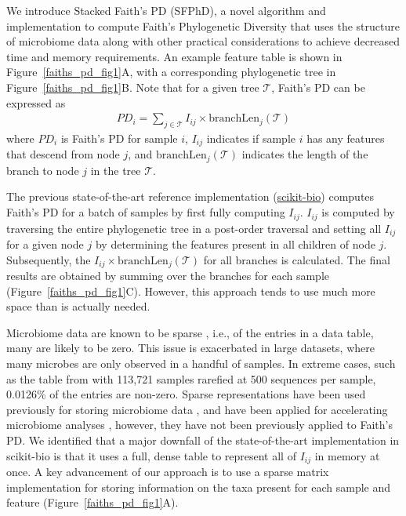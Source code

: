 We introduce Stacked Faith’s PD (SFPhD), a novel algorithm and implementation to compute Faith’s Phylogenetic Diversity that uses the structure of microbiome data along with other practical considerations to achieve decreased time and memory requirements. An example feature table is shown in Figure~\ref{faiths_pd_fig1}A, with a corresponding phylogenetic tree in Figure~\ref{faiths_pd_fig1}B. Note that for a given tree $\mathcal{T}$, Faith's PD can be expressed as
\begin{align}
PD_i = \sum_{j\in \mathcal{T}} I_{ij} \times \text{branchLen}_{j}(\mathcal{T})
\end{align}
where $PD_i$ is Faith's PD for sample $i$, $I_{ij}$ indicates if sample $i$ has any features that descend from node $j$, and $\text{branchLen}_j(\mathcal{T})$ indicates the length of the branch to node $j$ in the tree $\mathcal{T}$.

The previous state-of-the-art reference implementation (\href{http://scikit-bio.org/}{scikit-bio}) computes Faith's PD for a batch of samples by first fully computing $I_{ij}$. $I_{ij}$ is computed by traversing the entire phylogenetic tree in a post-order traversal and setting all $I_{ij}$ for a given node $j$ by determining the features present in all children of node $j$. Subsequently, the $I_{ij} \times \text{branchLen}_j(\mathcal{T})$ for all branches is calculated. The final results are obtained by summing over the branches for each sample (Figure~\ref{faiths_pd_fig1}C). However, this approach tends to use much more space than is actually needed.

Microbiome data are known to be sparse \cite{Martino2019-op,Kumar2018-or,Morton2017-bs}, i.e., of the entries in a data table, many are likely to be zero. This issue is exacerbated in large datasets, where many microbes are only observed in a handful of samples. In extreme cases, such as the table from \cite{McDonald2018-qq} with 113,721 samples rarefied at 500 sequences per sample, 0.0126\% of the entries are non-zero. Sparse representations have been used previously for storing microbiome data \cite{McDonald2012-go}, and have been applied for accelerating microbiome analyses \cite{McDonald2018-qq}, however, they have not been previously applied to Faith’s PD. We identified that a major downfall of the state-of-the-art implementation in scikit-bio is that it uses a full, dense table to represent all of $I_{ij}$ in memory at once. A key advancement of our approach is to use a sparse matrix implementation for storing information on the taxa present for each sample and feature (Figure~\ref{faiths_pd_fig1}A). 


